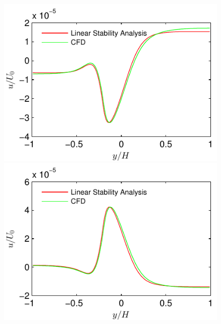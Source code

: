 \documentclass[12pt]{report}   %
\begin{document}
\begin{figure}
\centerline{\includegraphics{LinearStabilityVsCFD_u_phase0} \includegraphics{LinearStabilityVsCFD_u_phase90}}

\end{figure}
\end{document}
